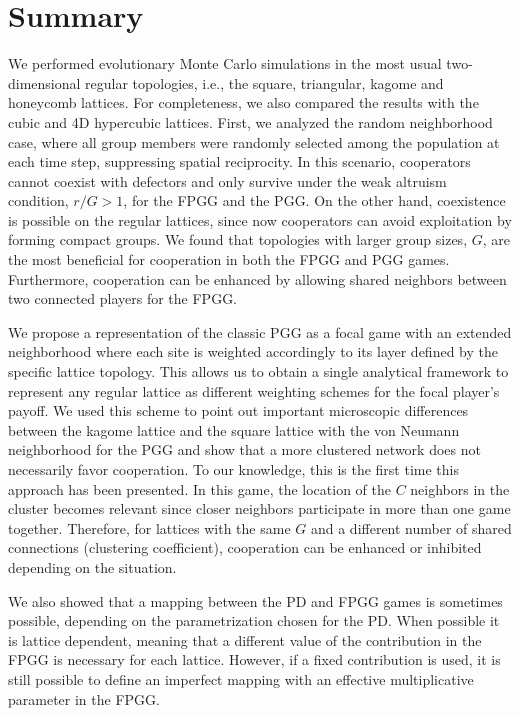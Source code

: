 \documentclass[5p,review]{elsarticle}
\begin{document}
\section{Summary}

We performed evolutionary Monte Carlo simulations in the most usual two-dimensional regular topologies, i.e., the square, triangular, kagome and honeycomb lattices. For completeness, we also compared the results with the cubic and 4D hypercubic lattices.
%
First, we analyzed the random neighborhood case, where all group members were randomly selected among the population at each time step, suppressing spatial reciprocity. In this scenario, cooperators cannot coexist with defectors and only survive under the weak altruism condition, $r/G>1$, for the FPGG and the PGG.
%
On the other hand, coexistence is possible on the regular lattices, since now cooperators can avoid exploitation by forming compact groups. We found that topologies with larger group sizes, $G$,  are the most beneficial for cooperation in both the FPGG and PGG games.
%
Furthermore, cooperation can be enhanced by allowing shared neighbors between two connected players for the FPGG.
%


We propose a representation of the classic PGG as a focal game with an extended neighborhood where each site is weighted accordingly to its layer defined by the specific lattice topology. This allows us to obtain a single analytical framework to represent any regular lattice as different weighting schemes for the focal player's payoff. We used this scheme to point out important microscopic differences between the kagome lattice and the square lattice with the von Neumann neighborhood for the PGG and show that a more clustered network does not necessarily favor cooperation. To our knowledge, this is the first time this approach has been presented.
%
In this game, the location of the $C$ neighbors in the cluster becomes relevant since closer neighbors participate in more than one game together. 
%
Therefore, for lattices with the same $G$ and a different number of shared connections (clustering coefficient), cooperation can be enhanced or inhibited depending on the situation. 
%


We also showed that a mapping between the PD and FPGG games is sometimes possible, depending on the parametrization chosen for the PD. When possible it is lattice dependent, meaning that a different value of the contribution in the FPGG is necessary for each lattice. However, if a fixed contribution is used, it is still possible to define an imperfect mapping with an effective multiplicative parameter in the FPGG.
%
\end{document}
